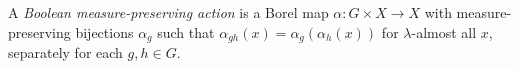 
A \emph{Boolean measure-preserving action} is a Borel map $\alpha:G\times X\to X$ with measure-preserving bijections $\alpha_g$ such that $\alpha_{gh}(x)=\alpha_g(\alpha_h(x))$ for $\lambda$-almost all $x$, separately for each $g,h\in G$.
